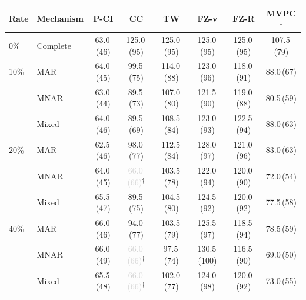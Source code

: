 \begin{tabular}{llcccccc}
    \toprule
    Rate & Mechanism & P-CI & CC & TW & FZ-v & FZ-R & MVPC$^\ddagger$ \\
    \midrule
    0\% & Complete & 63.0\,{\scriptsize(46)} & 125.0\,{\scriptsize(95)} & 125.0\,{\scriptsize(95)} & 125.0\,{\scriptsize(95)} & 125.0\,{\scriptsize(95)} & 107.5\,{\scriptsize(79)} \\
    \midrule
    10\% & MAR   & 64.0\,{\scriptsize(45)} & 99.5\,{\scriptsize(75)} & 114.0\,{\scriptsize(88)} & 123.0\,{\scriptsize(96)} & 118.0\,{\scriptsize(91)} & 88.0\,{\scriptsize(67)} \\
         & MNAR  & 63.0\,{\scriptsize(44)} & 89.5\,{\scriptsize(73)} & 107.0\,{\scriptsize(80)} & 121.5\,{\scriptsize(90)} & 119.0\,{\scriptsize(88)} & 80.5\,{\scriptsize(59)} \\
         & Mixed & 64.0\,{\scriptsize(46)} & 89.5\,{\scriptsize(69)} & 108.5\,{\scriptsize(84)} & 123.0\,{\scriptsize(93)} & 122.5\,{\scriptsize(94)} & 88.0\,{\scriptsize(63)} \\
    \midrule
    20\% & MAR   & 62.5\,{\scriptsize(46)} & 98.0\,{\scriptsize(77)} & 112.5\,{\scriptsize(84)} & 128.0\,{\scriptsize(97)} & 121.0\,{\scriptsize(96)} & 83.0\,{\scriptsize(63)} \\
         & MNAR  & 64.0\,{\scriptsize(45)} & \textcolor{lightgray}{66.0\,{\scriptsize(66)}}$^\dagger$ & 103.5\,{\scriptsize(78)} & 122.0\,{\scriptsize(94)} & 120.0\,{\scriptsize(90)} & 72.0\,{\scriptsize(54)} \\
         & Mixed & 65.5\,{\scriptsize(47)} & 89.5\,{\scriptsize(75)} & 104.5\,{\scriptsize(80)} & 124.5\,{\scriptsize(92)} & 120.0\,{\scriptsize(92)} & 77.5\,{\scriptsize(58)} \\
    \midrule
    40\% & MAR   & 66.0\,{\scriptsize(46)} & 94.0\,{\scriptsize(77)} & 103.5\,{\scriptsize(79)} & 125.5\,{\scriptsize(97)} & 118.5\,{\scriptsize(94)} & 78.5\,{\scriptsize(59)} \\
         & MNAR  & 66.0\,{\scriptsize(49)} & \textcolor{lightgray}{66.0\,{\scriptsize(66)}}$^\dagger$ & 97.5\,{\scriptsize(74)} & 130.5\,{\scriptsize(100)} & 116.5\,{\scriptsize(90)} & 69.0\,{\scriptsize(50)} \\
         & Mixed & 65.5\,{\scriptsize(48)} & \textcolor{lightgray}{66.0\,{\scriptsize(66)}}$^\dagger$ & 102.0\,{\scriptsize(77)} & 124.0\,{\scriptsize(98)} & 120.0\,{\scriptsize(92)} & 73.0\,{\scriptsize(55)} \\
    \bottomrule
\end{tabular}
